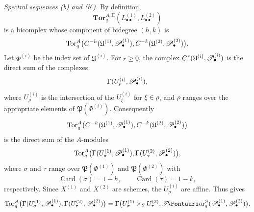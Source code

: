 \begin{env}[6.6.4]
\label{III.6.6.4}
\emph{Spectral sequences \textnormal{(b)} and
\textnormal{(b$'$)}.}
By definition,
\[
  \mathbf{Tor}_q^{A,\mathrm{II}}
  (L_{\bullet\bullet}^{(1)},L_{\bullet\bullet}^{(2)})
\]
is a bicomplex whose component of bidegree $(h,k)$ is
\[
  \operatorname{Tor}_q^A
  \bigl(
    C^{-h}(\mathfrak U^{(1)},\mathscr{P}_\bullet^{(1)}),
    C^{-k}(\mathfrak U^{(2)},\mathscr{P}_\bullet^{(2)})
  \bigr).
\]
Let $\Phi^{(i)}$ be the index set of $\mathfrak U^{(i)}$.  For
$r\geq0$, the complex
$C^r(\mathfrak U^{(i)},\mathscr{P}_\bullet^{(i)})$ is the direct sum
of the complexes
\[
  \Gamma(U_\rho^{(i)},\mathscr{P}_\bullet^{(i)}),
\]
where $U_\rho^{(i)}$ is the intersection of the
$U_\xi^{(i)}$ for $\xi\in\rho$, and $\rho$ ranges over the
appropriate elements of $\mathfrak P(\Phi^{(i)})$.
Consequently
\[
  \operatorname{Tor}_q^A
  \bigl(
    C^{-h}(\mathfrak U^{(1)},\mathscr{P}_\bullet^{(1)}),
    C^{-k}(\mathfrak U^{(2)},\mathscr{P}_\bullet^{(2)})
  \bigr)
\]
is the direct sum of the $A$-modules
\[
  \operatorname{Tor}_q^A
  \bigl(
    \Gamma(U_\sigma^{(1)},\mathscr{P}_\bullet^{(1)}),
    \Gamma(U_\tau^{(2)},\mathscr{P}_\bullet^{(2)})
  \bigr),
\]
where $\sigma$ and $\tau$ range over
$\mathfrak P(\Phi^{(1)})$ and $\mathfrak P(\Phi^{(2)})$ with
\[
  \operatorname{Card}(\sigma)=1-h,
  \qquad
  \operatorname{Card}(\tau)=1-k,
\]
respectively.  Since $X^{(1)}$ and $X^{(2)}$ are schemes, the
$U_\rho^{(i)}$ are affine.  Thus  gives
\[
  \Tor_q^A
  \bigl(
    \Gamma(U_\sigma^{(1)},\sh P_\bullet^{(1)}),
    \Gamma(U_\tau^{(2)},\sh P_\bullet^{(2)})
  \bigr)
  =
  \Gamma\bigl(
    U_\sigma^{(1)}\times_SU_\tau^{(2)},
    \shTor_q^S(\sh P_\bullet^{(1)},\sh P_\bullet^{(2)})
  \bigr).
\]



\end{env}
